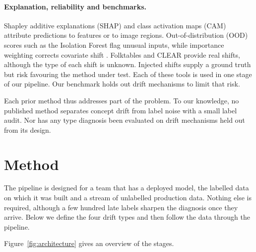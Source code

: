 \documentclass[10pt]{article}
\newcommand{\keep}[1]{\needspace{#1\baselineskip}}
\begin{document}
\paragraph{Explanation, reliability and benchmarks.} Shapley additive explanations (SHAP) \cite{lundberg2017unified} and class activation maps (CAM) \cite{zhou2016cam} attribute predictions to features or to image regions. Out-of-distribution (OOD) scores such as the Isolation Forest \cite{liu2008isolation} flag unusual inputs, while importance weighting corrects covariate shift \cite{shimodaira2000,sugiyama2007,cortes2010weights}. Folktables \cite{ding2021retiring} and CLEAR \cite{lin2021clear} provide real shifts, although the type of each shift is unknown. Injected shifts supply a ground truth \cite{rabanser2019failing} but risk favouring the method under test. Each of these tools is used in one stage of our pipeline. Our benchmark holds out drift mechanisms to limit that risk.

Each prior method thus addresses part of the problem. To our knowledge, no published method separates concept drift from label noise with a small label audit. Nor has any type diagnosis been evaluated on drift mechanisms held out from its design.

\section{Method}
\label{sec:method}

The pipeline is designed for a team that has a deployed model, the labelled data on which it was built and a stream of unlabelled production data. Nothing else is required, although a few hundred late labels sharpen the diagnosis once they arrive. Below we define the four drift types and then follow the data through the pipeline.

\keep{13}Figure~\ref{fig:architecture} gives an overview of the stages.
\end{document}

